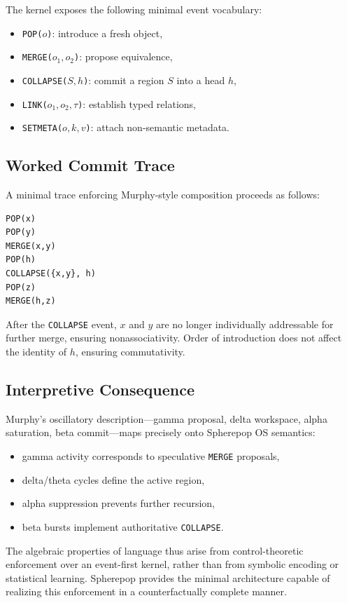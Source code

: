 \documentclass[11pt]{article}
\begin{document}
The kernel exposes the following minimal event vocabulary:
\begin{itemize}
\item \texttt{POP($o$)}: introduce a fresh object,
\item \texttt{MERGE($o_1,o_2$)}: propose equivalence,
\item \texttt{COLLAPSE($S,h$)}: commit a region $S$ into a head $h$,
\item \texttt{LINK($o_1,o_2,\tau$)}: establish typed relations,
\item \texttt{SETMETA($o,k,v$)}: attach non-semantic metadata.
\end{itemize}

\subsection{Worked Commit Trace}

A minimal trace enforcing Murphy-style composition proceeds as follows:

\begin{verbatim}
POP(x)
POP(y)
MERGE(x,y)
POP(h)
COLLAPSE({x,y}, h)
POP(z)
MERGE(h,z)
\end{verbatim}

After the \texttt{COLLAPSE} event, $x$ and $y$ are no longer individually addressable for further merge, ensuring nonassociativity. Order of introduction does not affect the identity of $h$, ensuring commutativity.

\subsection{Interpretive Consequence}

Murphy’s oscillatory description—gamma proposal, delta workspace, alpha saturation, beta commit—maps precisely onto Spherepop OS semantics:
\begin{itemize}
\item gamma activity corresponds to speculative \texttt{MERGE} proposals,
\item delta/theta cycles define the active region,
\item alpha suppression prevents further recursion,
\item beta bursts implement authoritative \texttt{COLLAPSE}.
\end{itemize}

The algebraic properties of language thus arise from control-theoretic enforcement over an event-first kernel, rather than from symbolic encoding or statistical learning. Spherepop provides the minimal architecture capable of realizing this enforcement in a counterfactually complete manner.
\end{document}
